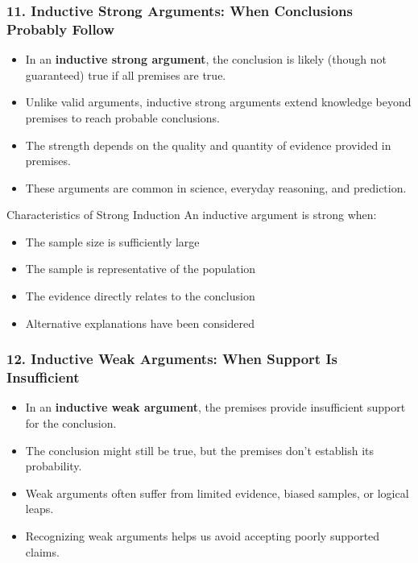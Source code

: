 \documentclass{beamer}
\begin{document}
\begin{frame}
\frametitle{11. Inductive Strong Arguments: When Conclusions Probably Follow}
\begin{itemize}
\item In an \textbf{inductive strong argument}, the conclusion is likely (though not guaranteed) true if all premises are true. 
\item Unlike valid arguments, inductive strong arguments extend knowledge beyond premises to reach probable conclusions.
\item The strength depends on the quality and quantity of evidence provided in premises.
\item These arguments are common in science, everyday reasoning, and prediction. 
\end{itemize}

\begin{block}{Characteristics of Strong Induction}
\scriptsize
An inductive argument is strong when:
\begin{itemize}
\item The sample size is sufficiently large
\item The sample is representative of the population
\item The evidence directly relates to the conclusion
\item Alternative explanations have been considered
\end{itemize}
\end{block}
\end{frame}







\begin{frame}
\frametitle{12. Inductive Weak Arguments: When Support Is Insufficient}
\begin{itemize}
\item In an \textbf{inductive weak argument}, the premises provide insufficient support for the conclusion.
\item The conclusion might still be true, but the premises don't establish its probability.
\item Weak arguments often suffer from limited evidence, biased samples, or logical leaps.
\item Recognizing weak arguments helps us avoid accepting poorly supported claims.
\end{itemize}

\end{frame}
\end{document}
